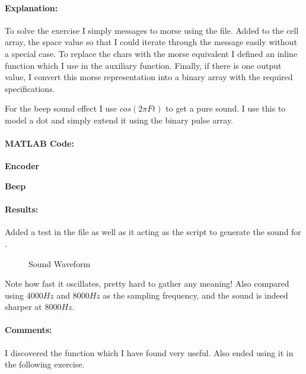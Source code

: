 
\paragraph{Explanation:}
To solve the exercise I simply messages to
morse using the  file.
Added to the cell array, the space value so that I could iterate through the
message easily without a special case.
To replace the chars with the morse equivalent I defined an inline
function  which I use in the
 auxiliary function.
Finally, if there is one output value, I convert this morse
representation into a binary array with the required specifications.

For the beep sound effect I use $ cos(2 \pi F t) $ to get a pure
sound. I use this to model a dot and simply extend it using the
binary pulse array.

\paragraph{MATLAB Code:}

\textbf{Encoder}
\begin{tiny}
    
\end{tiny}

\textbf{Beep}
\begin{tiny}
    
\end{tiny}

\paragraph{Results:}

Added a test in the  file as well as it acting
as the script to generate the sound for .

\begin{figure}[H]
    \centering
    
    \caption{Sound Waveform}
    \label{fig:figures/ex1.svg}
\end{figure}

Note how fast it oscillates, pretty hard to gather any meaning!
Also compared using $ 4000Hz $ and $ 8000Hz $ as the sampling
frequency, and the sound is indeed sharper at $ 8000Hz $.

\paragraph{Comments:}
I discovered the  function which I have found very
useful. Also ended using it in the following exercise.

